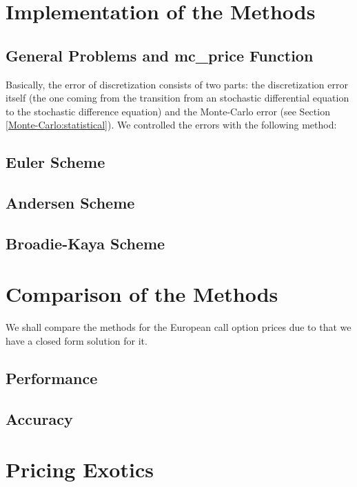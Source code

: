 \chapter{Implementation of the Methods}
    \section{General Problems and mc\_price Function}
        Basically, the error of discretization consists of two parts: the discretization error itself (the one coming from the transition from an stochastic differential equation to the stochastic difference equation) and the Monte-Carlo error (see Section \ref{Monte-Carlo:statistical}).
        We controlled the errors with the following method:

        \cite{Glasserman2013}



    \section{Euler Scheme}

    \section{Andersen Scheme}

    \section{Broadie-Kaya Scheme}


\chapter{Comparison of the Methods}
    We shall compare the methods for the European call option prices due to that we have a closed form solution for it.
    \section{Performance}

    \section{Accuracy}

\chapter{Pricing Exotics}